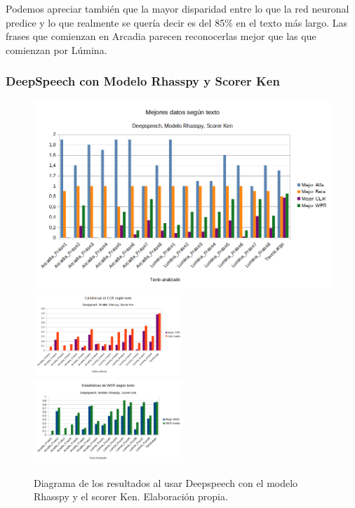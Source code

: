 Podemos apreciar también que la mayor disparidad entre lo que la red neuronal predice y lo que realmente se quería decir es del 85\% en el texto más largo. Las frases que comienzan en Arcadia parecen reconocerlas mejor que las que comienzan por Lúmina.

\subsubsection{DeepSpeech con Modelo Rhasspy y Scorer Ken}

\begin{figure}[H]
	\includegraphics[width=\textwidth]{imagenes/MejoresResultados_DeepSpeechIvanKenRhasspy.png} \\
	\includegraphics[width=0.5\textwidth]{imagenes/CER_DeepSpeechIvanKenRhasspy.png} \hfill \includegraphics[width=0.5\textwidth]{imagenes/WER_DeepspeechIvanKenRhasspy.png}
	\caption[Diagramas de Alfa, Beta, WER y CER - Rhasspy y Ken]{Diagrama de los resultados al usar Deepspeech con el modelo Rhasspy y el scorer Ken. Elaboración propia.}
\end{figure}

